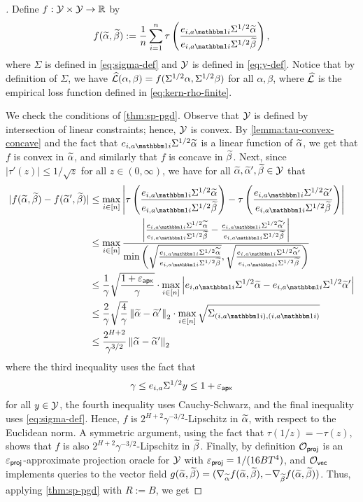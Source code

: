 \begin{proof}[]
Define $f: \mathcal{Y} \times \mathcal{Y} \to \mathbb{R}$ by 
\[f(\alphatil,\betatil) := \frac{1}{n}\sum_{i=1}^n \tau\left(\frac{e_{i,a\ind{i}}\Sigma^{1/2}\alphatil}{e_{i,a\ind{i}}\Sigma^{1/2}\betatil}\right),\]
where $\Sigma$ is defined in \cref{eq:sigma-def} and $\mathcal{Y}$ is defined in \cref{eq:y-def}. Notice that by definition of $\Sigma$, we have $\mathcal{\widehat{L}}(\alpha,\beta) = f(\Sigma^{1/2}\alpha,\Sigma^{1/2}\beta)$ for all $\alpha,\beta$, where $\mathcal{\widehat{L}}$ is the empirical loss function defined in \cref{eq:kern-rho-finite}.

We check the conditions of \cref{thm:sp-pgd}. Observe that $\mathcal{Y}$ is defined by intersection of linear constraints; hence, $\mathcal{Y}$ is convex. By \cref{lemma:tau-convex-concave} and the fact that $e_{i,a\ind{i}} \Sigma^{1/2} \alphatil$ is a linear function of $\widetilde\alpha$, we get that $f$ is convex in $\widetilde\alpha$, and similarly that $f$ is concave in $\widetilde\beta$. Next, since $|\tau'(z)| \leq 1/\sqrt{z}$ for all $z \in (0,\infty)$, we have for all $\widetilde\alpha,\widetilde\alpha',\widetilde\beta \in \mathcal{Y}$ that 
\begin{align}
|f(\alphatil,\betatil) - f(\alphatil',\betatil)|
&\leq \max_{i \in [n]} \left|\tau\left(\frac{e_{i,a\ind{i}}\Sigma^{1/2}\alphatil}{e_{i,a\ind{i}}\Sigma^{1/2}\betatil}\right) - \tau\left(\frac{e_{i,a\ind{i}}\Sigma^{1/2}\alphatil'}{e_{i,a\ind{i}}\Sigma^{1/2}\betatil}\right)\right| \\ 
&\leq \max_{i \in [n]} \frac{ \left|\frac{e_{i,a\ind{i}}\Sigma^{1/2}\alphatil}{e_{i,a\ind{i}}\Sigma^{1/2}\betatil} - \frac{e_{i,a\ind{i}}\Sigma^{1/2}\alphatil'}{e_{i,a\ind{i}}\Sigma^{1/2}\betatil}\right|}{\min\left(\sqrt{\frac{e_{i,a\ind{i}}\Sigma^{1/2}\alphatil}{e_{i,a\ind{i}}\Sigma^{1/2}\betatil}}, \sqrt{\frac{e_{i,a\ind{i}}\Sigma^{1/2}\alphatil'}{e_{i,a\ind{i}}\Sigma^{1/2}\betatil}}\right)} \\ 
&\leq \frac{1}{\gamma} \sqrt{\frac{1+\epapx}{\gamma}} \cdot \max_{i \in [n]} \left|e_{i,a\ind{i}}\Sigma^{1/2}\alphatil-e_{i,a\ind{i}}\Sigma^{1/2}\alphatil'\right| \\ 
&\leq \frac{2}{\gamma} \sqrt{\frac{4}{\gamma}} \norm{\alphatil - \alphatil'}_2 \cdot \max_{i \in [n]} \sqrt{\Sigma_{(i,a\ind{i}),(i,a\ind{i})}} \\ 
&\leq \frac{2^{H+2}}{\gamma^{3/2}} \norm{\alphatil-\alphatil'}_2
\end{align}
where the third inequality uses the fact that \[\gamma \leq e_{i,a}\Sigma^{1/2} y \leq 1+\varepsilon_{\mathsf{apx}}\] for all $y \in \mathcal{Y}$, the fourth inequality uses Cauchy-Schwarz, and the final inequality uses \cref{eq:sigma-def}. Hence, $f$ is $2^{H+2}\gamma^{-3/2}$-Lipschitz in $\widetilde\alpha$, with respect to the Euclidean norm. A symmetric argument, using the fact that $\tau(1/z)=-\tau(z)$, shows that $f$ is also $2^{H+2}\gamma^{-3/2}$-Lipschitz in $\widetilde\beta$. Finally, by definition $\mathcal{O}_{\mathsf{proj}}$ is an $\varepsilon_{\mathsf{proj}}$-approximate projection oracle for $\mathcal{Y}$ with $\varepsilon_{\mathsf{proj}} = 1/(16BT^4)$, and $\mathcal{O}_{\mathsf{vec}}$ implements queries to the vector field $g(\widetilde\alpha,\widetilde\beta) = (\nabla_{\widetilde\alpha} f(\widetilde\alpha,\widetilde\beta), -\nabla_{\widetilde\beta} f(\widetilde\alpha,\widetilde\beta))$. Thus, applying \cref{thm:sp-pgd} with $R := B$, we get

\end{proof}
